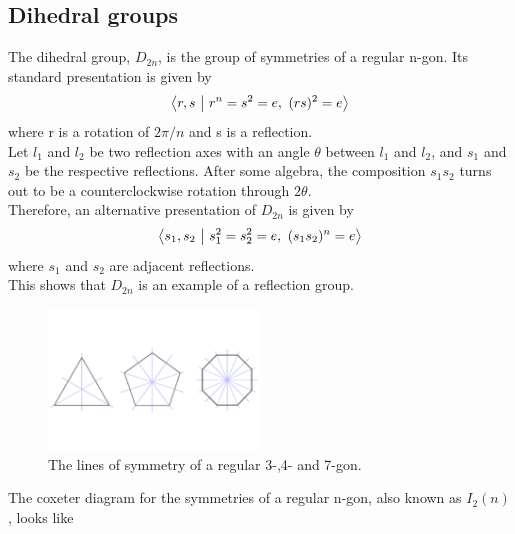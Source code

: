\documentclass[../main.tex]{subfiles}
\begin{document}
\subsection{Dihedral groups}

The dihedral group, $D_{2n}$, is the group of symmetries of a regular n-gon. Its standard presentation is given by
\[
\left\langle r,s \ \middle| \  r^n = s^2 = e, \ (rs)^2 = e \right\rangle
\]
where r is a rotation of $2\pi/n$ and s is a reflection.\\

Let $l_{1}$ and $l_{2}$ be two reflection axes with an angle $\theta$ between $l_{1}$ and $l_{2}$, and $s_{1}$ and $s_{2}$ be the respective reflections. After some algebra, the composition $s_{1}s_{2}$ turns out to be a counterclockwise rotation through $2\theta$.\\

Therefore, an alternative presentation of $D_{2n}$ is given by
\[
\left\langle s_1,s_2 \ \middle| \ s_1^2 = s_2^2 = e, \ (s_1s_2)^n = e \right\rangle
\]
where $s_{1}$ and $s_{2}$ are adjacent reflections.\\

This shows that $D_{2n}$ is an example of a reflection group.

\begin{figure}[ht]
    \centering
    \includegraphics[width=0.5\textwidth]{polygons.pdf}
    \caption{The lines of symmetry of a regular 3-,4- and 7-gon.}
    \label{}
\end{figure}

\begin{example}
The coxeter diagram for the symmetries of a regular n-gon, also known as $I_{2}(n)$, looks like
    \begin{figure}[H]
    \centering

\end{figure}
\end{example}
\end{document}

